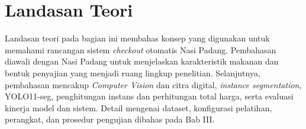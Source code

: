 \section{Landasan Teori}

Landasan teori pada bagian ini membahas konsep yang digunakan untuk memahami rancangan sistem \textit{checkout} otomatis Nasi Padang. Pembahasan diawali dengan Nasi Padang untuk menjelaskan karakteristik makanan dan bentuk penyajian yang menjadi ruang lingkup penelitian. Selanjutnya, pembahasan mencakup \textit{Computer Vision} dan citra digital, \textit{instance segmentation}, YOLO11-seg, penghitungan instans dan perhitungan total harga, serta evaluasi kinerja model dan sistem. Detail mengenai dataset, konfigurasi pelatihan, perangkat, dan prosedur pengujian dibahas pada Bab III.







